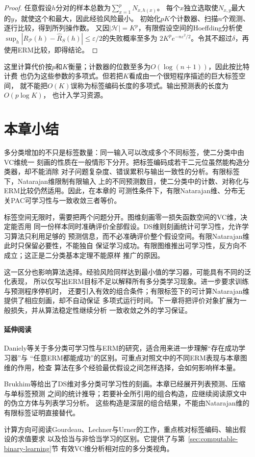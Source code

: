 \begin{proof}
任意假设$h$分对的样本总数为$\sum_{x=1}^pN_{x,h(x)}$。
每个$x$独立选取使$N_{x,y}$最大的$y$，就使这个和最大，因此经验风险最小。
初始化$pK$个计数器、扫描$n$个观测、逐行比较，得到所列操作数。
又因$|\mathcal H|=K^p$，有限假设空间的Hoeffding分析使
$\sup_h|R_{\mathcal P}(h)-\hat R_S(h)|\leq\varepsilon/2$的失败概率至多为
$2K^p e^{-n\varepsilon^2/2}$。令其不超过$\delta$，再使用ERM比较，即得结论。
\end{proof}

这里计算代价按$p$和$K$衡量；计数器的位数至多为$O(\log(n+1))$，因此按比特计费
也仍为这些参数的多项式。但若把$K$看成由一个很短程序描述的巨大标签空间，
就不能把$O(K)$误称为标签编码长度的多项式。输出预测表的长度为$O(p\log K)$，
也计入学习资源。

\section{本章小结}
\label{sec:multiclass-learning-summary}

多分类增加的不只是标签数量：同一输入可以改成多个不同标签，使二分类中由VC维统一
刻画的性质在一般情形下分开。把标签编码成若干二元位虽然能构造分类器，却不能消除
对子问题复杂度、错误累积与输出一致性的分析。有限标签下，Natarajan维限制有限输入
上的不同预测数目，使二分类中的计数、对称化与ERM比较仍然适用。因此，在本章的
可测性条件下，有限Natarajan维、分布无关PAC可学习性与一致收敛三者等价。

标签空间无限时，需要把两个问题分开。图维刻画零一损失函数空间的VC维，决定能否用
同一份样本同时准确评价全部假设。DS维则刻画统计可学习性，允许学习算法只利用足够的
预测信息，而不必准确评价整个假设空间。有限Natarajan维此时只保留必要性，不能独自
保证学习成功。有限图维推出可学习性，反方向不成立；这正是二分类基本定理不能原样
推广的原因。

这一区分也影响算法选择。经验风险同样达到最小值的学习器，可能具有不同的泛化表现，
所以仅写出ERM目标不足以解释所有多分类学习现象。进一步要求训练与预测程序停机时，
还要引入有效的组合条件；有限标签下的可计算Natarajan维提供了相应刻画，却不自动保证
多项式运行时间。下一章将把评价对象扩展为一般损失，并从算法稳定性继续分析
一致收敛之外的学习保证。

\paragraph{延伸阅读}
Daniely等关于多分类可学习性与ERM的研究，适合用来进一步理解“存在成功学习器”与
“任意ERM都能成功”的区别。可重点对照文中的不同ERM表现与本章图维的作用，检查
算法在多个经验最优假设之间怎样选择，会如何影响样本量。

Brukhim等给出了DS维对多分类可学习性的刻画。本章已经展开列表预测、压缩与单标签预测
之间的统计推导；若要补全所引用的组合构造，应继续阅读原文中的伪立方体与列表学习分析。
这些构造是深层的组合结果，不能由Natarajan维的有限标签证明直接替代。

计算方向可阅读Gourdeau、Lechner与Urner的工作，重点核对标签编码、输出假设的求值要求
以及恰当与非恰当学习的区别。它提供了与第~\ref{sec:computable-binary-learning}节
有效VC维分析相对应的多分类视角。
